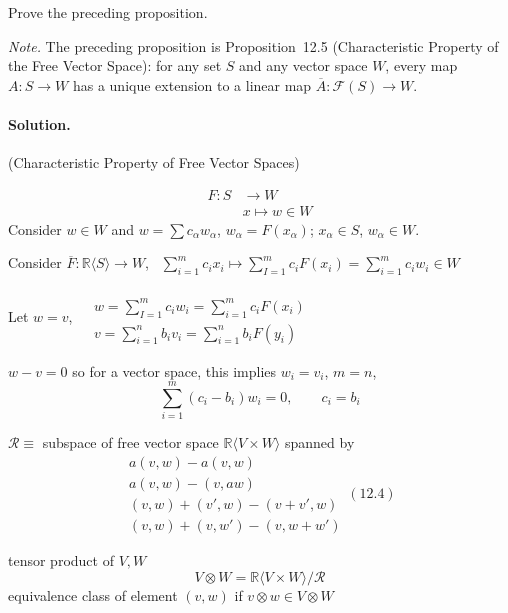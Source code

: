 \begin{exercise}
Prove the preceding proposition.
\end{exercise}
\noindent\emph{Note.} The preceding proposition is Proposition~12.5 (Characteristic Property of the Free Vector Space): for any set $S$ and any vector space $W$, every map $A\colon S\to W$ has a unique extension to a linear map $\overline{A}\colon\mathcal{F}(S)\to W$.
\paragraph{Solution.} (Characteristic Property of Free Vector Spaces)

\[
\begin{aligned}
  F : S & \to W \\ 
  & x \mapsto w \in W 
\end{aligned}
\]
Consider $w\in W$ and $w = \sum c_{\alpha} w_{\alpha}$, $w_{\alpha} = F(x_{\alpha})$; $x_{\alpha} \in S$, $w_{\alpha} \in W$.  

Consider $\overline{F}:\mathbb{R}\langle S \rangle \to W$, \, $\sum_{i=1}^m c_i x_i \mapsto \sum_{I=1}^m c_i F(x_i) = \sum_{i=1}^m c_i w_i \in W$

Let $w= v$, $\begin{aligned} & \quad \\ & w = \sum_{I=1}^m c_i w_i = \sum_{i=1}^m c_i F(x_i) \\ & v = \sum_{i=1}^n b_i v_i = \sum_{i=1}^n b_i F(y_i) \end{aligned}$

$w - v =0$ so for a vector space, this implies $w_i = v_i$, $m=n$, 
\[
\sum_{i=1}^m (c_i-b_i)w_i = 0, \quad \quad c_i = b_i
\]

$\mathcal{R} \equiv$ subspace of free vector space $\mathbb{R}\langle V \times W \rangle $ spanned by 
\begin{equation}
\begin{gathered}
  a(v,w) - a(v, w) \\
  a(v,w) - (v,aw) \\
(v,w) + (v',w) - (v+v',w) \\
  (v,w) + (v,w') - (v,w+w')
\end{gathered} (12.4)
\end{equation}

tensor product of $V, W$ 
\[
V\otimes W = \mathbb{R} \langle V \times W \rangle / \mathcal{R}
\]
equivalence class of element $(v,w)$ if $v\otimes w \in V\otimes W$

